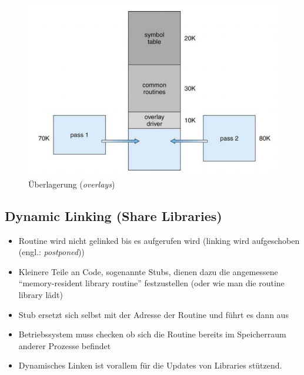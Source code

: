 \documentclass[a4paper]{scrreprt}
\begin{document}
\begin{figure}[ht]
\centering
\includegraphics[scale=0.50]{graphics/overlays.png}
\caption{Überlagerung (\textit{overlays})}
\end{figure}

\subsection{Dynamic Linking (Share Libraries)}
\begin{itemize}
\item Routine wird nicht gelinked bis es aufgerufen wird (linking wird aufgeschoben (engl.: \textit{postponed}))
\item Kleinere Teile an Code, sogenannte Stubs, dienen dazu die angemessene "`memory-resident library routine"' festzustellen (oder wie man die routine library lädt)
\item Stub ersetzt sich selbst mit der Adresse der Routine und führt es dann aus
\item Betriebssystem muss checken ob sich die Routine  bereits im Speicherraum anderer Prozesse befindet
\item Dynamisches Linken ist vorallem für die Updates von Libraries stützend.
\end{itemize}
\end{document}
